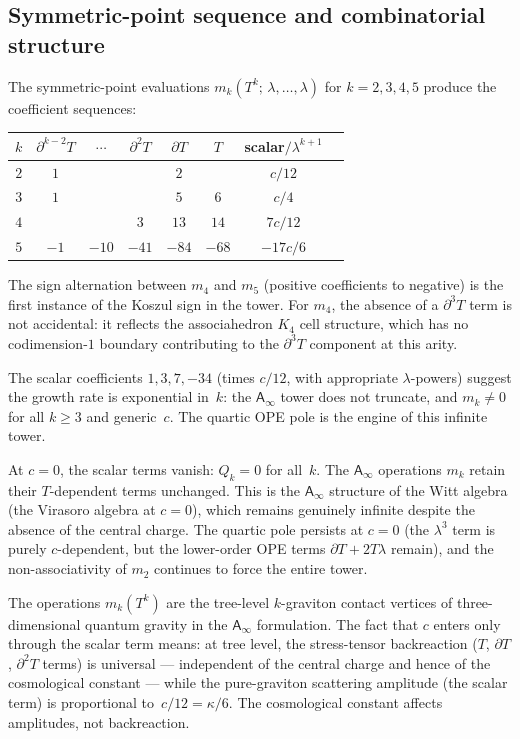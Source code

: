 \documentclass[11pt]{article}
\newcommand{\Ainf}{\mathsf{A}_{\infty}}
\begin{document}
\subsection{Symmetric-point sequence and combinatorial structure}

The symmetric-point evaluations
$m_k(T^k;\,\lambda, \ldots, \lambda)$ for $k = 2, 3, 4, 5$
produce the coefficient sequences:
\begin{center}
\small
\renewcommand{\arraystretch}{1.3}
\begin{tabular}{@{}c*{6}{c}c@{}}
$k$
  & $\partial^{k-2}T$ & $\cdots$ & $\partial^2 T$
  & $\partial T$ & $T$ & scalar$/\lambda^{k+1}$ \\
\hline
$2$ & $1$ & & & $2$ & & $c/12$ \\
$3$ & $1$ & & & $5$ & $6$ & $c/4$ \\
$4$ & & & $3$ & $13$ & $14$ & $7c/12$ \\
$5$ & $-1$ & $-10$ & $-41$ & $-84$ & $-68$ & $-17c/6$
\end{tabular}
\end{center}

\noindent
The sign alternation between $m_4$ and $m_5$ (positive coefficients
to negative) is the first instance of the Koszul sign in the tower.
For $m_4$, the absence of a $\partial^3 T$ term is not accidental: it
reflects the associahedron $K_4$ cell structure, which has no
codimension-$1$ boundary contributing to the $\partial^3 T$ component
at this arity.

The scalar coefficients $1, 3, 7, -34$ (times $c/12$, with
appropriate $\lambda$-powers) suggest the growth rate is exponential
in~$k$: the $\Ainf$ tower does not truncate, and $m_k \neq 0$ for
all $k \geq 3$ and generic~$c$.  The quartic OPE pole is the engine
of this infinite tower.

\begin{remark}[$c = 0$: the Witt tower]
\label{rem:witt-tower-wn}
At $c = 0$, the scalar terms vanish: $Q_k = 0$ for all~$k$.
The $\Ainf$ operations $m_k$ retain their $T$-dependent terms
unchanged.  This is the $\Ainf$ structure of the Witt algebra
(the Virasoro algebra at $c = 0$), which remains genuinely
infinite despite the absence of the central charge.  The quartic
pole persists at $c = 0$ (the $\lambda^3$ term is purely
$c$-dependent, but the lower-order OPE terms $\partial T + 2T\lambda$
remain), and the non-associativity of $m_2$ continues to force the
entire tower.
\end{remark}

\begin{remark}
\label{rem:gravitational-feynman-wn}
The operations $m_k(T^k)$ are the tree-level $k$-graviton contact
vertices of three-dimensional quantum gravity in the $\Ainf$
formulation.  The fact that $c$ enters only through the scalar
term means: at tree level, the stress-tensor backreaction ($T$,
$\partial T$, $\partial^2 T$ terms) is universal --- independent
of the central charge and hence of the cosmological constant ---
while the pure-graviton scattering amplitude (the scalar term) is
proportional to~$c/12 = \kappa/6$.  The cosmological constant
affects amplitudes, not backreaction.
\end{remark}
\end{document}

